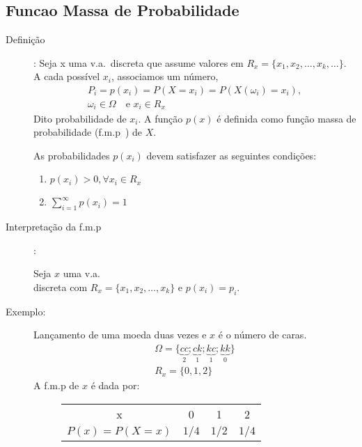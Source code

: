 \documentclass[11pt,a4paper]{book}
\begin{document}
   \subsection{Funcao Massa de Probabilidade} 
   \begin{description}
     \item [Definição]: Seja x uma v.a.\ discreta que assume valores em $R_{x}=\{x_1,x_2,\dots,
       x_{k},\dots\}$. A cada possível $x_{i}$, associamos um número, 
       \begin{align*}
         P_{i}=p({x_i})=P(X={x_i})=P(X( \omega_i)=x_i),\\
         \omega_{i} \in \Omega \quad \text{e } x_{i} \in R_{x} \nonumber
       \end{align*}
       Dito probabilidade de $x_{i}$. A função $p(x)$ é definida como função massa de probabilidade 
       (f.m.p\ ) de $X$. 

       As probabilidades $p(x_i)$ devem satisfazer as seguintes condições: 
       \begin{enumerate} %
         \item $p(x_i)>0, \forall x_i \in R_{x}$

         \item $\sum^\infty_{i=1} p(x_i)=1$
       \end{enumerate}
     \item [Interpretação da f.m.p\ ]: 

       Seja $x$ uma v.a.\\ discreta com $R_{x}= \{x_1,x_2,\dots,x_k \}$ e $p(x_i)=p_i$.
       \begin{figure}[htpb]
         \centering
         \caption{}
         \label{fig:24}
       \end{figure}

     \item [Exemplo:] Lançamento de uma moeda duas vezes e $x$ é o número de caras.
       \begin{align*}
         \Omega = \{ \underbrace{cc}_{2}; \underbrace{ck}_{1};\underbrace{kc}_{1};\underbrace{kk}_{0} \} \\
         R_{x}= \{0,1,2\}
       \end{align*}
       A f.m.p de $x$ é dada por: 
       \begin{figure} [H]
         \begin{tabular}{ c c c c}
           \toprule
           x &0&1&2 \\ \cmidrule{1-4}
           $P(x)=P(X=x)$&$1/4$&$1/2$& $1/4$\\    \bottomrule
         \end{tabular}
         \label{tab:4}
       \end{figure}



\end{description}
\end{document}
